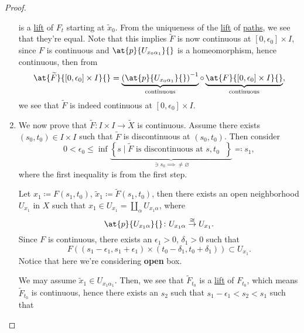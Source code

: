 \begin{proof}
\begin{enumerate}[(1)]
\[		      \]
		      is a \hyperref[def:lift]{lift} of \(F_{t} \) starting at \(\widetilde{x} _0\). From the uniqueness of the
		      \hyperref[def:lift]{lift} of \hyperref[def:path]{paths}, we see that they're equal. Note that this implies
		      \(\widetilde{F} \) is now continuous at \([0, \epsilon _0]\times I\), since \(F\) is continuous and \(\at{p}{U_{x_0 \alpha _1}}{}\) is a homeomorphism, hence continuous, then from
		      \[
			      \at{\widetilde{F} }{[0, \epsilon _0]\times I}{}
			      = \underbrace{\left(\at{p}{U_{x_0 \alpha _1}}{} \right)^{-1}}_{\text{continuous} }
			      \circ \underbrace{\vphantom{\left(\at{p}{U_{x_0 \alpha _1}}{} \right)^{-1}}\at{F}{[0, \epsilon _0]\times I}{}}_{\text{continuous}},
		      \]
		      we see that \(\widetilde{F} \) is indeed continuous at \([0, \epsilon _0]\times I\).
		\item We now prove that \(\widetilde{F} \colon I\times I\to \widetilde{X} \) is continuous. Assume there exists \((s_0, t_0)\in I\times I\) such that \(\widetilde{F} \) is
		      discontinuous at \((s_0, t_0)\). Then consider
		      \[
			      0 < \epsilon _0\leq \inf \underbrace{\left\{s\mid \widetilde{F} \text{ is discontinuous at \(s, t_0\) } \right\}}_{\ni s_0 \implies \neq \varnothing} \eqqcolon s_1,
		      \]
		      where the first inequality is from the first step.
		      \begin{figure}[H]
			      \centering
			      \label{fig:pf:col:lec14-6}
		      \end{figure}
		      Let \(x_1\coloneqq F(s_1, t_0)\), \(\widetilde{x} _1\coloneqq \widetilde{F} (s_1, t_0)\), then there exists an open neighborhood \(U_{x_1}\) in \(X\) such that
		      \(x_1\in U_{x_1} = \coprod_\alpha U_{x_1 \alpha }\), where
		      \[
			      \at{p}{U_{x_1 \alpha }}{}\colon U_{x_1 \alpha }\overset{\cong }{\to }U_{x_1}.
		      \]
		      Since \(F\) is continuous, there exists an \(\epsilon _1> 0\), \(\delta _1> 0\) such that
		      \[
			      F\left((s_1 - \epsilon _1, s_1 + \epsilon _1) \times (t_{0}-\delta _1, t_0 + \delta _1 )\right) \subset U_{x_1}.
		      \]
		      Notice that here we're considering \textbf{open} box.
		      \begin{figure}[H]
			      \centering
			      \label{fig:pf:col:lec14-7}
		      \end{figure}
		      We may assume \(\widetilde{x} _1\in U_{x_1 \alpha _1}\). Then, we see that \(\widetilde{F} _{t_0}\) is a \hyperref[def:lift]{lift} of
		      \(F_{t_0}\), which means \(\widetilde{F} _{t_0}\) is continuous, hence there exists an \(s_{2} \) such that \(s_{1}-\epsilon _1<s_{2}< s_1  \) such that

\end{enumerate}
\end{proof}
